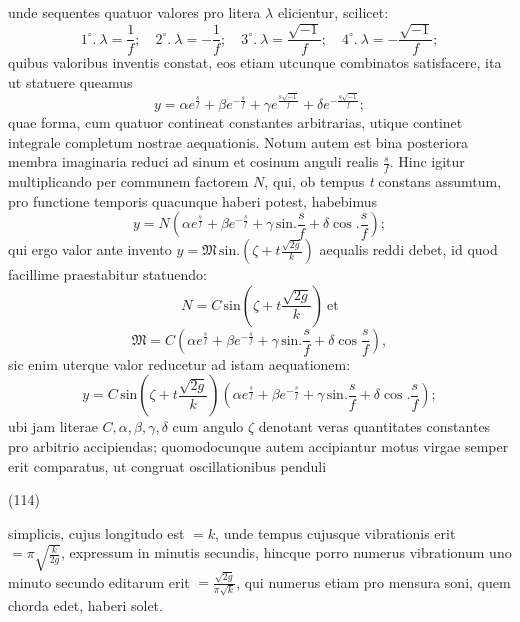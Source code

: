 \documentclass[11pt,a4paper]{article}
\begin{document}
unde sequentes quatuor valores pro litera $\lambda$ elicientur, scilicet:
\[
1^\circ.\ \lambda = \frac{1}{f}; \quad 2^\circ.\ \lambda = -\frac{1}{f}; \quad
3^\circ.\ \lambda = \frac{\sqrt{-1}}{f}; \quad 4^\circ.\ \lambda = -\frac{\sqrt{-1}}{f};
\]
quibus valoribus inventis constat, eos etiam utcunque combinatos satisfacere,
ita ut statuere queamus
\[
y = \alpha e^{\frac{s}{f}} + \beta e^{-\frac{s}{f}} + \gamma e^{\frac{s\sqrt{-1}}{f}} + \delta e^{-\frac{s\sqrt{-1}}{f}};
\]
quae forma, cum quatuor contineat constantes arbitrarias, utique continet
integrale completum nostrae aequationis. Notum autem est bina posteriora
membra imaginaria reduci ad sinum et cosinum anguli realis $\frac{s}{f}$. Hinc
igitur multiplicando per communem factorem $N$, qui, ob tempus \emph{t}
constans assumtum, pro functione temporis quacunque haberi potest, habebimus
\[
y = N\left(\alpha e^{\frac{s}{f}} + \beta e^{-\frac{s}{f}} + \gamma\,\text{sin.}\frac{s}{f} + \delta\cos.\frac{s}{f}\right);
\]
qui ergo valor ante invento
$y = \mathfrak{M}\,\text{sin.}\left(\zeta + t\frac{\sqrt{2g}}{k}\right)$
aequalis reddi debet, id quod facillime praestabitur statuendo:
\[
N = C\,\text{sin}\left(\zeta + t\frac{\sqrt{2g}}{k}\right) \ \text{et}
\]
\[
\mathfrak{M} = C\left(\alpha e^{\frac{s}{f}} + \beta e^{-\frac{s}{f}} + \gamma\,\text{sin.}\frac{s}{f} + \delta\cos\frac{s}{f}\right),
\]
sic enim uterque valor reducetur ad istam aequationem:
\[
y = C\,\text{sin}\left(\zeta + t\frac{\sqrt{2g}}{k}\right)\left(\alpha e^{\frac{s}{f}} + \beta e^{-\frac{s}{f}} + \gamma\,\text{sin.}\frac{s}{f} + \delta\cos.\frac{s}{f}\right);
\]
ubi jam literae $C, \alpha, \beta, \gamma, \delta$ cum angulo $\zeta$ denotant
veras quantitates constantes pro arbitrio accipiendas; quomodocunque autem
accipiantur motus virgae semper erit comparatus, ut congruat oscillationibus
penduli

(114)

simplicis, cujus longitudo est $= k$, unde tempus cujusque vibrationis erit
$= \pi\sqrt{\frac{k}{2g}}$, expressum in minutis secundis, hincque porro
numerus vibrationum uno minuto secundo editarum erit
$= \frac{\sqrt{2g}}{\pi\sqrt{k}}$, qui numerus etiam pro mensura soni, quem
chorda edet, haberi solet.
\end{document}
